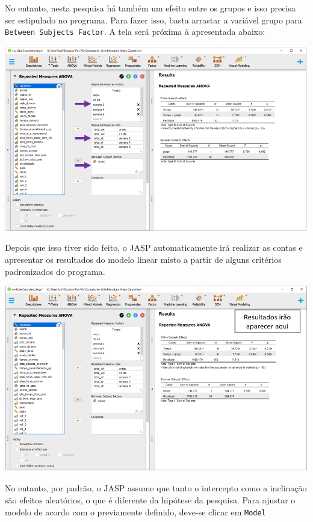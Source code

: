 \documentclass[
]{book}
\begin{document}
No entanto, nesta pesquisa há também um efeito entre os grupos e isso precisa ser estipulado no programa. Para fazer isso, basta arrastar a variável grupo para \texttt{Between\ Subjects\ Factor}. A tela será próxima à apresentada abaixo:

\includegraphics{./img/cap_anovarm_resultados.png}

Depois que isso tiver sido feito, o JASP automaticamente irá realizar as contas e apresentar os resultados do modelo linear misto a partir de alguns critérios padronizados do programa.

\includegraphics{./img/cap_anovarm_resultados2.png}

No entanto, por padrão, o JASP assume que tanto o intercepto como a inclinação são efeitos aleatórios, o que é diferente da hipótese da pesquisa. Para ajustar o modelo de acordo com o previamente definido, deve-se clicar em \texttt{Model}
\end{document}
